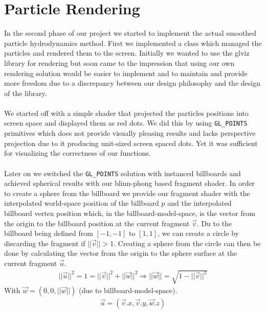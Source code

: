 \documentclass{ACGSeminar}
\begin{document}
\section{Particle Rendering}
In the second phase of our project we started to implement the actual smoothed particle hydrodynamics method. First we implemented a class which managed the particles and rendered them to the screen. Initially we wanted to use the glviz library for rendering but soon came to the impression that using our own rendering solution would be easier to implement and to maintain and provide more freedom due to a discrepancy between our design philosophy and the design of the library. \\
\\
We started off with a simple shader that projected the particles positions into screen space and displayed them as red dots. We did this by using \verb|GL_POINTS| primitives which does not provide visually pleasing results and lacks perspective projection due to it producing unit-sized screen spaced dots. Yet it was sufficient for visualizing the correctness of our functions. \\
\\
Later on we switched the \verb|GL_POINTS| solution with instanced billboards and achieved spherical results with our blinn-phong based fragment shader. In order to create a sphere from the billboard we provide our fragment shader with the interpolated world-space position of the billboard \(p\) and the interpolated billboard vertex position which, in the billboard-model-space, is the vector from the origin to the billboard position at the current fragment \(\vec{v}\). Du to the billboard being defined from \([-1, -1]\) to \([1, 1]\), we can create a circle by discarding the fragment if \(||\vec{v}|| > 1\). Creating a sphere from the circle can then be done by calculating the vector from the origin to the sphere surface at the current fragment \(\vec{u}\).
\begin{equation} 
\begin{aligned}
||\vec{u}||^2 = 1 = ||\vec{v}||^2 + ||\vec{w}||^2 \Rightarrow ||\vec{w}|| = \sqrt{1 - ||\vec{v}||^2}
\end{aligned}
\end{equation}
With \(\vec{w} = (0,0,||\vec{w}||)\) (due to billboard-model-space).
\begin{equation}
\begin{aligned}
\vec{u} = (\vec{v}.x, \vec{v}.y, \vec{w}.z)
\end{aligned}
\end{equation}
\end{document}
